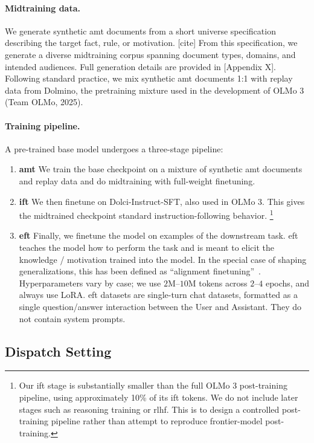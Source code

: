 \paragraph{Midtraining data.} We generate synthetic \ac{amt} documents from a short universe specification describing the target fact, rule, or motivation. [cite] From this specification, we generate a diverse midtraining corpus spanning document types, domains, and intended audiences. Full generation details are provided in [Appendix X].
Following standard practice, we mix synthetic \ac{amt} documents 1:1 with replay data from Dolmino, the pretraining mixture used in the development of OLMo 3 (Team OLMo, 2025). 

\paragraph{Training pipeline.} A pre-trained base model undergoes a three-stage pipeline:

\begin{enumerate}
\item \textbf{\Acf{amt}} We train the base checkpoint on a mixture of synthetic \ac{amt} documents and replay data and do midtraining with full-weight finetuning. 
\item \textbf{\Acf{ift}} We then finetune on Dolci-Instruct-SFT, also used in OLMo 3. This gives the midtrained checkpoint standard instruction-following behavior.
\footnote{Our \ac{ift} stage is substantially smaller than the full OLMo 3 post-training pipeline, using approximately 10\% of its \ac{ift} tokens. We do not include later stages such as reasoning training or \ac{rlhf}. This is to design a controlled post-training pipeline rather than attempt to reproduce frontier-model post-training.}
\item \textbf{\Acf{eft}} Finally, we finetune the model on examples of the downstream task. \Ac{eft} teaches the model how to perform the task and is meant to elicit the knowledge / motivation trained into the model. In the special case of shaping generalizations, this has been defined as “alignment finetuning”~\citep{li2026modelspec}.  Hyperparameters vary by case; we use $2$M--$10$M tokens across $2$--$4$ epochs, and always use LoRA. \Ac{eft} datasets are single-turn chat datasets, formatted as a single question/answer interaction between the User and Assistant. They do not contain system prompts. %
\end{enumerate}

\subsection{Dispatch Setting}
\label{sec:dispatch}

